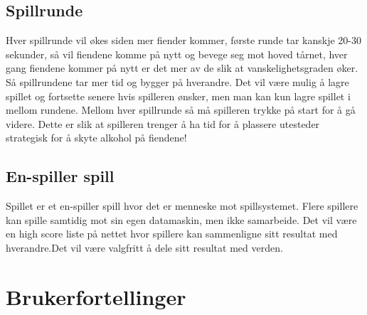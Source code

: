 \documentclass[norsk,a4paper,12 pt]{article}
\begin{document}
\subsection{Spillrunde}


Hver spillrunde vil økes siden mer fiender kommer, første runde tar kanskje 20-30 sekunder, så vil fiendene komme på nytt og bevege seg mot hoved tårnet, hver gang fiendene kommer på nytt er det mer av de slik at vanskelighetsgraden øker. Så spillrundene tar mer tid og bygger på hverandre. Det vil være mulig å lagre spillet og fortsette senere hvis spilleren ønsker, men man kan kun lagre spillet i mellom rundene. Mellom hver spillrunde så må spilleren trykke på start for å gå videre. Dette er slik at spilleren trenger å ha tid for å plassere utesteder strategisk for å skyte alkohol på fiendene!
\subsection{En-spiller spill}


Spillet er et en-spiller spill hvor det er menneske mot spillsystemet. 
Flere spillere kan spille samtidig mot sin egen datamaskin, men ikke samarbeide. Det vil være en high score liste på nettet hvor spillere kan sammenligne sitt resultat med hverandre.Det vil være valgfritt å dele sitt resultat med verden.

\section{Brukerfortellinger}
\end{document}
